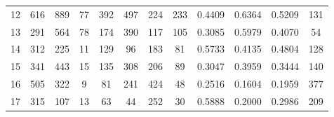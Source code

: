 \begin{table}[htbp]
\begin{tabular}{r S[table-format=5.0] S[table-format=5.0] S[table-format=3.0] *{4}{S[table-format=4.0]} *{3}{S[table-format=1.4]} S[table-format=4.0]}
    12 &  616 &   889 &   77 &   392 &   497 &   224 &   233 &  0.4409 &  0.6364 &  0.5209 &   131\\
    13 &  291 &   564 &   78 &   174 &   390 &   117 &   105 &  0.3085 &  0.5979 &  0.4070 &    54\\
    14 &  312 &   225 &   11 &   129 &    96 &   183 &    81 &  0.5733 &  0.4135 &  0.4804 &   128\\
    15 &  341 &   443 &   15 &   135 &   308 &   206 &    89 &  0.3047 &  0.3959 &  0.3444 &   140\\
    16 &  505 &   322 &    9 &    81 &   241 &   424 &    48 &  0.2516 &  0.1604 &  0.1959 &   377\\
    17 &  315 &   107 &   13 &    63 &    44 &   252 &    30 &  0.5888 &  0.2000 &  0.2986 &   209\\
    \bottomrule
  \end{tabular}
\endgroup
\end{table}

